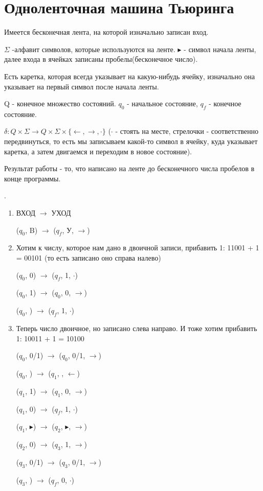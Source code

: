 \section{Одноленточная машина Тьюринга}
Имеется бесконечная лента, на которой изначально записан вход.


$\Sigma$ -алфавит символов, которые используются на ленте.
$\blacktriangleright$ - символ начала ленты, далее входа в ячейках записаны пробелы(бесконечное число).

Есть каретка, которая всегда указывает на какую-нибудь ячейку, изначально она указывает на первый символ после начала ленты.

Q - конечное множество состояний. $q_0$ - начальное состояние, $q_f$ - конечное состояние. 

$\delta: Q \times \Sigma \longrightarrow Q \times \Sigma \times \{\leftarrow, 
\rightarrow, \cdot\}$ ($\cdot$ - стоять на месте, стрелочки - соответственно передвинуться, то есть мы записываем какой-то символ в ячейку,
куда указывает каретка, а затем двигаемся и переходим в новое состояние).

Результат работы - то, что написано на ленте до бесконечного числа пробелов в конце программы.

\begin{exmp} .\\
	\begin{enumerate}
		\item ВХОД $\longrightarrow$ УХОД

		($q_0$, B) $\longrightarrow$ ($q_f$, У, $\rightarrow$)
		\item Хотим к числу, которое нам дано в двоичной записи, прибавить 1: 11001 + 1 = 00101 (то есть записано оно справа налево)

		($q_0$, 0) $\longrightarrow$ ($q_f$, 1, $\cdot$)

		($q_0$, 1) $\longrightarrow$ ($q_0$, 0, $\rightarrow$)

		($q_0$, \textvisiblespace) $\longrightarrow$ ($q_f$, 1, $\cdot$)
		\item Теперь число двоичное, но записано слева направо. И тоже хотим прибавить 1: 10011 + 1 = 10100

		($q_0$, 0/1) $\longrightarrow$ ($q_0$, 0/1, $\rightarrow$)

		($q_0$, \textvisiblespace) $\longrightarrow$ ($q_1$, \textvisiblespace, $\leftarrow$)

		($q_1$, 1) $\longrightarrow$ ($q_1$, 0, $\rightarrow$)

		($q_1$, 0) $\longrightarrow$ ($q_f$, 1, $\cdot$)

		($q_1$, $\blacktriangleright$) $\longrightarrow$ ($q_2$, $\blacktriangleright$, $\rightarrow$)

		($q_2$, 0) $\longrightarrow$ ($q_3$, 1, $\rightarrow$)

		($q_3$, 0/1) $\longrightarrow$ ($q_3$, 0/1, $\rightarrow$)

		($q_3$, \textvisiblespace) $\longrightarrow$ ($q_f$, 0, $\cdot$)
	\end{enumerate}	
\end{exmp}
